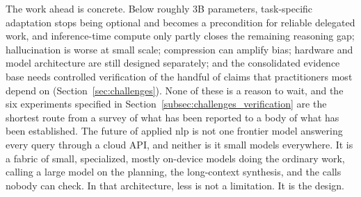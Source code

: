 The work ahead is concrete. Below roughly 3B parameters, task-specific
adaptation stops being optional and becomes a precondition for reliable
delegated work, and inference-time compute only partly closes the remaining
reasoning gap;
hallucination is worse at small scale; compression can amplify bias; hardware and
model architecture are still designed separately; and the consolidated evidence
base needs controlled verification of the handful of claims that practitioners
most depend on (Section~\ref{sec:challenges}). None of these is a reason to wait,
and the six experiments specified in
Section~\ref{subsec:challenges_verification} are the shortest route from a survey
of what has been reported to a body of what has been established.
The future of applied \gls{nlp} is not one frontier model answering every query
through a cloud API, and neither is it small models everywhere. It is a fabric of
small, specialized, mostly on-device models doing the ordinary work, calling a
large model on the planning, the long-context synthesis, and the calls nobody can
check. In that architecture, less is not a limitation. It is the design.
